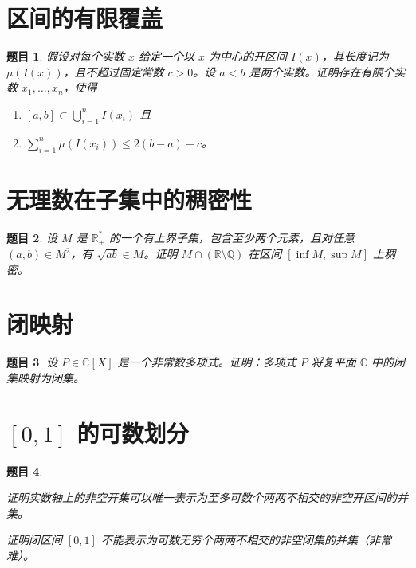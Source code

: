 \documentclass[12pt,UTF8]{ctexbook}
\theoremstyle{exercisestyle}
\newtheorem*{exercise}{题目}
\theoremstyle{solutionstyle}
\begin{document}
\section{区间的有限覆盖}
\begin{exercise}
假设对每个实数 \(x\) 给定一个以 \(x\) 为中心的开区间 \(I(x)\)，其长度记为 \(\mu(I(x))\)，且不超过固定常数 \(c > 0\)。设 \(a < b\) 是两个实数。证明存在有限个实数 \(x_1, \ldots, x_n\)，使得
\begin{enumerate}[label=(\textit{\roman*})]
\item \([a, b] \subset \bigcup_{i=1}^{n} I(x_i)\) 且
\item \(\sum_{i=1}^{n} \mu(I(x_i)) \leqslant 2(b-a) + c\)。
\end{enumerate}
\end{exercise}

\section{无理数在子集中的稠密性}
\begin{exercise}
  设 \( M \) 是 \( \mathbb{R}^*_+ \) 的一个有上界子集，包含至少两个元素，且对任意 \( (a, b) \in M^2 \)，有 \( \sqrt{ab} \in M \)。证明 \( M \cap (\mathbb{R} \setminus \mathbb{Q}) \) 在区间 \( [\inf M, \sup M] \) 上稠密。
\end{exercise}

\section{闭映射}\label{application-fermee}
\begin{exercise}
  设 \( P \in \mathbb{C}[X] \) 是一个非常数多项式。证明：多项式 \( P \) 将复平面 \( \mathbb{C} \) 中的闭集映射为闭集。
\end{exercise}

\section{$[0,1]$ 的可数划分}
\begin{exercise}
  \begin{subquestions}
    \item 证明实数轴上的非空开集可以唯一表示为至多可数个两两不相交的非空开区间的并集。
    \item 证明闭区间 \([0,1]\) 不能表示为可数无穷个两两不相交的非空闭集的并集（非常难）。
  \end{subquestions}
\end{exercise}
\end{document}
